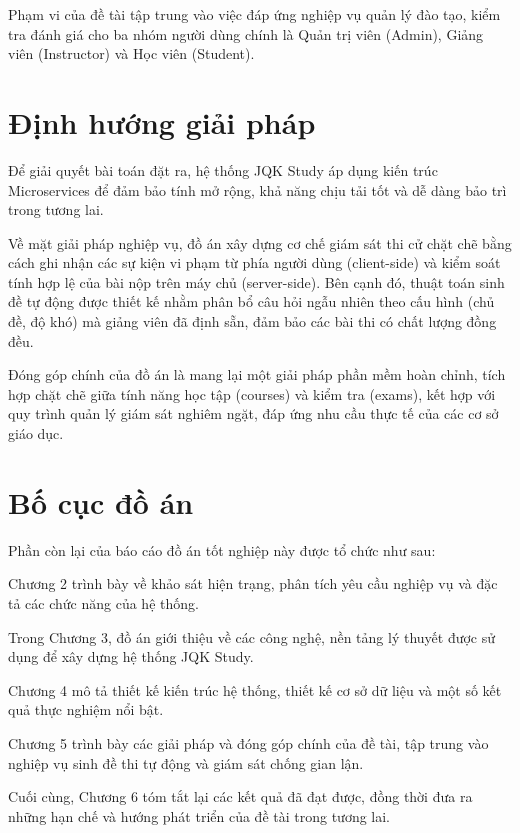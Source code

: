 \documentclass[../DoAn.tex]{subfiles}
\begin{document}
Phạm vi của đề tài tập trung vào việc đáp ứng nghiệp vụ quản lý đào tạo, kiểm tra đánh giá cho ba nhóm người dùng chính là Quản trị viên (Admin), Giảng viên (Instructor) và Học viên (Student).

\section{Định hướng giải pháp}
\label{section:1.3}
Để giải quyết bài toán đặt ra, hệ thống JQK Study áp dụng kiến trúc Microservices để đảm bảo tính mở rộng, khả năng chịu tải tốt và dễ dàng bảo trì trong tương lai. 

Về mặt giải pháp nghiệp vụ, đồ án xây dựng cơ chế giám sát thi cử chặt chẽ bằng cách ghi nhận các sự kiện vi phạm từ phía người dùng (client-side) và kiểm soát tính hợp lệ của bài nộp trên máy chủ (server-side). Bên cạnh đó, thuật toán sinh đề tự động được thiết kế nhằm phân bổ câu hỏi ngẫu nhiên theo cấu hình (chủ đề, độ khó) mà giảng viên đã định sẵn, đảm bảo các bài thi có chất lượng đồng đều.

Đóng góp chính của đồ án là mang lại một giải pháp phần mềm hoàn chỉnh, tích hợp chặt chẽ giữa tính năng học tập (courses) và kiểm tra (exams), kết hợp với quy trình quản lý giám sát nghiêm ngặt, đáp ứng nhu cầu thực tế của các cơ sở giáo dục.

\section{Bố cục đồ án}
\label{section:1.4}
Phần còn lại của báo cáo đồ án tốt nghiệp này được tổ chức như sau:

Chương 2 trình bày về khảo sát hiện trạng, phân tích yêu cầu nghiệp vụ và đặc tả các chức năng của hệ thống. 

Trong Chương 3, đồ án giới thiệu về các công nghệ, nền tảng lý thuyết được sử dụng để xây dựng hệ thống JQK Study.

Chương 4 mô tả thiết kế kiến trúc hệ thống, thiết kế cơ sở dữ liệu và một số kết quả thực nghiệm nổi bật.

Chương 5 trình bày các giải pháp và đóng góp chính của đề tài, tập trung vào nghiệp vụ sinh đề thi tự động và giám sát chống gian lận.

Cuối cùng, Chương 6 tóm tắt lại các kết quả đã đạt được, đồng thời đưa ra những hạn chế và hướng phát triển của đề tài trong tương lai.
\end{document}
